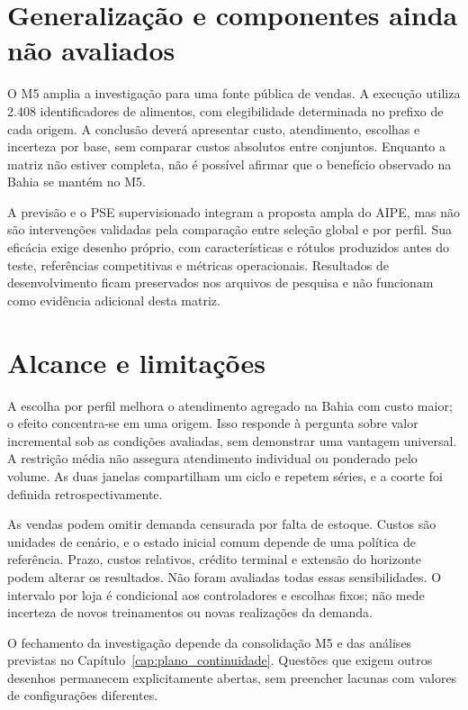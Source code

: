 \section{Generalização e componentes ainda não avaliados}
\label{sec:resultados_m5}

O M5 amplia a investigação para uma fonte pública de vendas. A execução utiliza 2.408 identificadores de alimentos, com elegibilidade determinada no prefixo de cada origem. A conclusão deverá apresentar custo, atendimento, escolhas e incerteza por base, sem comparar custos absolutos entre conjuntos. Enquanto a matriz não estiver completa, não é possível afirmar que o benefício observado na Bahia se mantém no M5.

A previsão e o PSE supervisionado integram a proposta ampla do AIPE, mas não são intervenções validadas pela comparação entre seleção global e por perfil. Sua eficácia exige desenho próprio, com características e rótulos produzidos antes do teste, referências competitivas e métricas operacionais. Resultados de desenvolvimento ficam preservados nos arquivos de pesquisa e não funcionam como evidência adicional desta matriz.

\section{Alcance e limitações}
\label{sec:threats}

A escolha por perfil melhora o atendimento agregado na Bahia com custo maior; o efeito concentra-se em uma origem. Isso responde à pergunta sobre valor incremental sob as condições avaliadas, sem demonstrar uma vantagem universal. A restrição média não assegura atendimento individual ou ponderado pelo volume. As duas janelas compartilham um ciclo e repetem séries, e a coorte foi definida retrospectivamente.

As vendas podem omitir demanda censurada por falta de estoque. Custos são unidades de cenário, e o estado inicial comum depende de uma política de referência. Prazo, custos relativos, crédito terminal e extensão do horizonte podem alterar os resultados. Não foram avaliadas todas essas sensibilidades. O intervalo por loja é condicional aos controladores e escolhas fixos; não mede incerteza de novos treinamentos ou novas realizações da demanda.

O fechamento da investigação depende da consolidação M5 e das análises previstas no Capítulo~\ref{cap:plano_continuidade}. Questões que exigem outros desenhos permanecem explicitamente abertas, sem preencher lacunas com valores de configurações diferentes.
